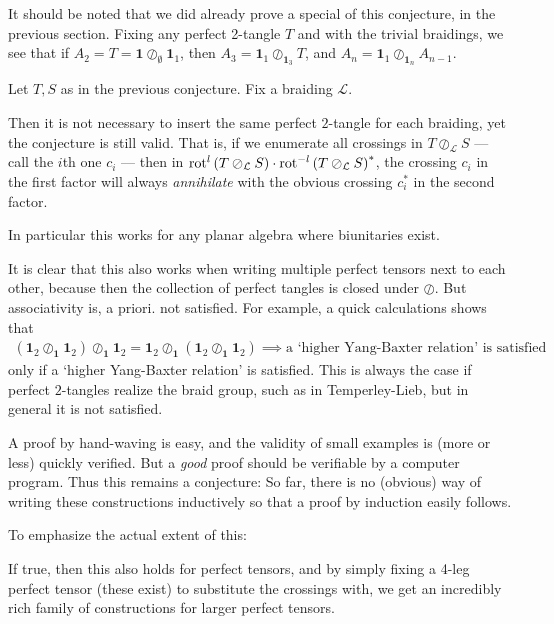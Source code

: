 It should be noted that we did already prove a special of this conjecture, in the previous section. Fixing any perfect 2-tangle $T$ and with the trivial braidings, we see that if $A_2 = T = \mathbf{1}\oslash_\emptyset \mathbf{1}_1$, then $A_3 = \mathbf{1}_1\oslash_{\mathbf{1}_3} T$, and $A_n = \mathbf{1}_1\oslash_{\mathbf{1}_n} A_{n-1}$.

\begin{conjecture}
Let $T,S$ as in the previous conjecture. Fix a braiding $\mathcal{L}$. 

Then it is not necessary to insert the same perfect $2$-tangle for each braiding, yet the conjecture is still valid. That is, if we enumerate all crossings in $T\oslash_\mathcal{L}S$ --- call the $i$th one $c_i$ --- then in $\operatorname{rot}^l \left(T\oslash_\mathcal{L}S\right) \cdot \operatorname{rot}^{-l}\left( T\oslash_\mathcal{L} S \right)^*$, the crossing $c_i$ in the first factor will always \emph{annihilate} with the obvious crossing $c_i^*$ in the second factor.

In particular this works for any planar algebra where biunitaries exist.
\end{conjecture}
It is clear that this also works when writing multiple perfect tensors next to each other, because then the collection of perfect tangles is closed under $\oslash$. But associativity is, a priori. not satisfied. For example, a quick calculations shows that
\begin{align*}
\left( \mathbf{1}_2\oslash_\mathbf{1}  \mathbf{1}_2  \right) \oslash_ \mathbf{1}  \mathbf{1}_2 =  \mathbf{1}_2 \oslash_ \mathbf{1} \left(  \mathbf{1}_2 \oslash_ \mathbf{1}  \mathbf{1}_2 \right) \implies \text{a `higher Yang-Baxter relation' is satisfied}
\end{align*}
only if a `higher Yang-Baxter relation' is satisfied. This is always the case if perfect $2$-tangles realize the braid group, such as in Temperley-Lieb, but in general it is not satisfied.

\bigno A proof by hand-waving is easy, and the validity of small examples is (more or less) quickly verified. But a \emph{good} proof should be verifiable by a computer program. Thus this remains a conjecture: So far, there is no (obvious) way of writing these constructions inductively so that a proof by induction easily follows.

\bigno To emphasize the actual extent of this:
\begin{center}
\begin{minipage}{0.8\textwidth}
If true, then this also holds for perfect tensors, and by simply fixing a 4-leg perfect tensor (these exist) to substitute the crossings with, we get an incredibly rich family of constructions for larger perfect tensors.
\end{minipage}
\end{center}

